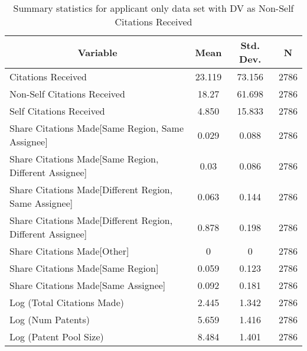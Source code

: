 
\begin{table}[htbp]\centering \caption{Summary statistics for applicant only data set with DV as Non-Self Citations Received \label{a.nsummary}}
\begin{tabular}{l c c  c}\hline\hline
\multicolumn{1}{c}{\textbf{Variable}} & \textbf{Mean}
 & \textbf{Std. Dev.} & \textbf{N}\\ \hline
Citations Received & 23.119 & 73.156  & 2786\\
Non-Self Citations Received & 18.27 & 61.698  & 2786\\
Self Citations Received & 4.850 & 15.833  & 2786\\
Share Citations Made[Same Region, Same Assignee] & 0.029 & 0.088  & 2786\\
Share Citations Made[Same Region, Different Assignee] & 0.03 & 0.086  & 2786\\
Share Citations Made[Different Region, Same Assignee] & 0.063 & 0.144  & 2786\\
Share Citations Made[Different Region, Different Assignee] & 0.878 & 0.198  & 2786\\
Share Citations Made[Other] & 0 & 0  & 2786\\
Share Citations Made[Same Region] & 0.059 & 0.123  & 2786\\
Share Citations Made[Same Assignee] & 0.092 & 0.181  & 2786\\
Log (Total Citations Made) & 2.445 & 1.342  & 2786\\
Log (Num Patents) & 5.659 & 1.416  & 2786\\
Log (Patent Pool Size) & 8.484 & 1.401  & 2786\\
\hline\end{tabular}
\end{table}
